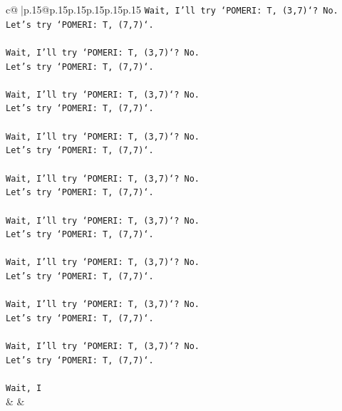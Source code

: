 \documentclass{article}
\begin{document}
{\begin{supertabular}{c@{$\;$}|p{.15\linewidth}@{}p{.15\linewidth}p{.15\linewidth}p{.15\linewidth}p{.15\linewidth}p{.15\linewidth}}
{{{\texttt{Wait, I'll try `POMERI: T, (3,7)`? No.} \\
\texttt{Let's try `POMERI: T, (7,7)`.} \\
\\ 
\texttt{Wait, I'll try `POMERI: T, (3,7)`? No.} \\
\texttt{Let's try `POMERI: T, (7,7)`.} \\
\\ 
\texttt{Wait, I'll try `POMERI: T, (3,7)`? No.} \\
\texttt{Let's try `POMERI: T, (7,7)`.} \\
\\ 
\texttt{Wait, I'll try `POMERI: T, (3,7)`? No.} \\
\texttt{Let's try `POMERI: T, (7,7)`.} \\
\\ 
\texttt{Wait, I'll try `POMERI: T, (3,7)`? No.} \\
\texttt{Let's try `POMERI: T, (7,7)`.} \\
\\ 
\texttt{Wait, I'll try `POMERI: T, (3,7)`? No.} \\
\texttt{Let's try `POMERI: T, (7,7)`.} \\
\\ 
\texttt{Wait, I'll try `POMERI: T, (3,7)`? No.} \\
\texttt{Let's try `POMERI: T, (7,7)`.} \\
\\ 
\texttt{Wait, I'll try `POMERI: T, (3,7)`? No.} \\
\texttt{Let's try `POMERI: T, (7,7)`.} \\
\\ 
\texttt{Wait, I'll try `POMERI: T, (3,7)`? No.} \\
\texttt{Let's try `POMERI: T, (7,7)`.} \\
\\ 
\texttt{Wait, I} \\
            }
        }
    }
    & & \\ \\


\end{supertabular}}
\end{document}
